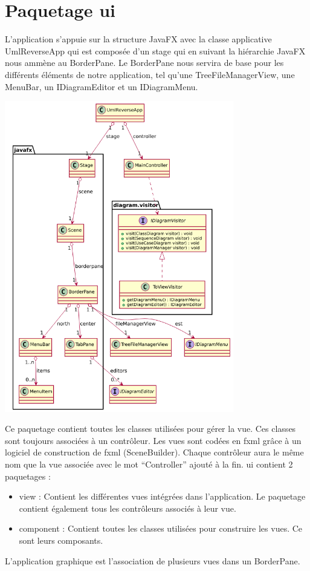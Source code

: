 \documentclass[a4paper,10pt]{article}
\begin{document}
  \section{Paquetage ui}
    L'application s'appuie sur la structure JavaFX avec la classe applicative UmlReverseApp qui est composée d'un stage qui en suivant
    la hiérarchie JavaFX nous ammène au BorderPane. Le BorderPane nous servira de base pour les différents éléments de notre application,
    tel qu'une TreeFileManagerView, une MenuBar, un IDiagramEditor et un IDiagramMenu.
    \begin{center}
	\includegraphics[width=10cm]{Image/Vue.png}
    \end{center}
  
    Ce paquetage contient toutes les classes utilisées pour gérer la vue. Ces classes sont toujours associées à un contrôleur.
    Les vues sont codées en fxml grâce à un logiciel de construction de fxml (SceneBuilder). Chaque contrôleur aura le même nom
    que la vue associée avec le mot ``Controller'' ajouté à la fin.
    ui contient 2 paquetages :
    \begin{itemize}
    \item view : Contient les différentes vues intégrées dans l'application. Le paquetage contient également tous les contrôleurs associés à leur vue.
    \item component : Contient toutes les classes utilisées pour construire les vues. Ce sont leurs composants.
    \end{itemize}
    L'application graphique est l'association de plusieurs vues dans un BorderPane.
    
\end{document}
